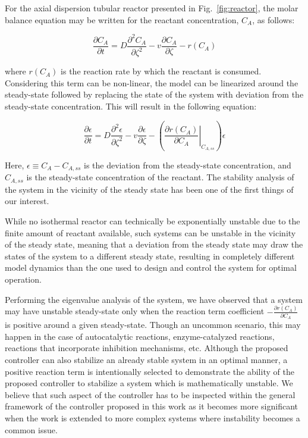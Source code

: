 \documentclass[12pt,answers]{exam}
\begin{document}
\begin{questions}
\begin{solutionorbox}
        For the axial dispersion tubular reactor presented in Fig.~\ref{fig:reactor}, the molar balance equation may be written for the reactant concentration, $C_A$, as follows:
        
        \begin{equation}
            \frac{\partial C_A}{\partial t} = D \frac{\partial^2 C_A}{\partial \zeta^2} - v \frac{\partial C_A}{\partial \zeta} - r(C_A)
        \end{equation}
        
        where $r(C_A)$ is the reaction rate by which the reactant is consumed. Considering this term can be non-linear, the model can be linearized around the steady-state followed by replacing the state of the system with deviation from the steady-state concentration. This will result in the following equation:
        
        \begin{equation}
            \frac{\partial \epsilon}{\partial t} = D \frac{\partial^2 \epsilon}{\partial \zeta^2} - v \frac{\partial \epsilon}{\partial \zeta} - \left( \left. \frac{\partial r(C_A)}{\partial C_A} \right|_{C_{A, ss}} \right) \epsilon
        \end{equation}
        
        Here, $\epsilon \equiv C_A - C_{A, ss}$ is the deviation from the steady-state concentration, and $C_{A, ss}$ is the steady-state concentration of the reactant. The stability analysis of the system in the vicinity of the steady state has been one of the first things of our interest. 
        
        While no isothermal reactor can technically be exponentially unstable due to the finite amount of reactant available, such systems can be unstable in the vicinity of the steady state, meaning that a deviation from the steady state may draw the states of the system to a different steady state, resulting in completely different model dynamics than the one used to design and control the system for optimal operation.
        
        Performing the eigenvalue analysis of the system, we have observed that a system may have unstable steady-state only when the reaction term coefficient $-\frac{\partial r(C_A)}{\partial C_A}$ is positive around a given steady-state. Though an uncommon scenario, this may happen in the case of autocatalytic reactions, enzyme-catalyzed reactions, reactions that incorporate inhibition mechanisms, etc. Although the proposed controller can also stabilize an already stable system in an optimal manner, a positive reaction term is intentionally selected to demonstrate the ability of the proposed controller to stabilize a system which is mathematically unstable. We believe that such aspect of the controller has to be inspected within the general framework of the controller proposed in this work as it becomes more significant when the work is extended to more complex systems where instability becomes a common issue.


\end{solutionorbox}
\end{questions}
\end{document}
